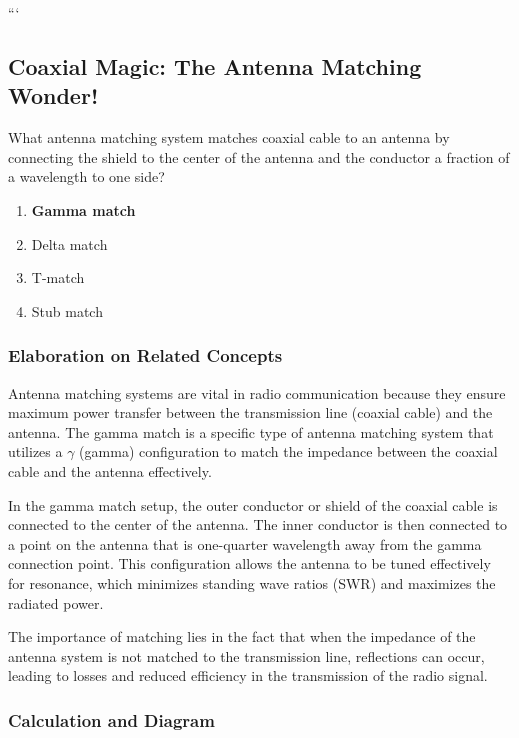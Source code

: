```
\subsection{Coaxial Magic: The Antenna Matching Wonder!}

\begin{tcolorbox}[colback=gray!10, colframe=black, title=E9E02]
What antenna matching system matches coaxial cable to an antenna by connecting the shield to the center of the antenna and the conductor a fraction of a wavelength to one side?

\begin{enumerate}[label=\Alph*.]
    \item \textbf{Gamma match}
    \item Delta match
    \item T-match
    \item Stub match
\end{enumerate} \end{tcolorbox}

\subsubsection{Elaboration on Related Concepts}

Antenna matching systems are vital in radio communication because they ensure maximum power transfer between the transmission line (coaxial cable) and the antenna. The gamma match is a specific type of antenna matching system that utilizes a $\gamma$ (gamma) configuration to match the impedance between the coaxial cable and the antenna effectively. 

In the gamma match setup, the outer conductor or shield of the coaxial cable is connected to the center of the antenna. The inner conductor is then connected to a point on the antenna that is one-quarter wavelength away from the gamma connection point. This configuration allows the antenna to be tuned effectively for resonance, which minimizes standing wave ratios (SWR) and maximizes the radiated power.

The importance of matching lies in the fact that when the impedance of the antenna system is not matched to the transmission line, reflections can occur, leading to losses and reduced efficiency in the transmission of the radio signal.

\subsubsection{Calculation and Diagram}

